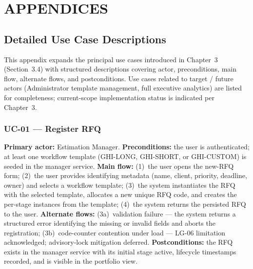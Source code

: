 \chapter*{APPENDICES}
\adjustmtc
\thispagestyle{MyStyle}
\makeatletter\renewcommand{}\makeatother
\appendix
\renewcommand{\thefigure}{A.\arabic{figure}}
\setcounter{figure}{0}

\section{Detailed Use Case Descriptions}
\label{app:use-cases}

This appendix expands the principal use cases introduced in Chapter~3 (Section~3.4) with structured descriptions covering actor, preconditions, main flow, alternate flows, and postconditions. Use cases related to target / future actors (Administrator template management, full executive analytics) are listed for completeness; current-scope implementation status is indicated per Chapter~3.

\subsection{UC-01 --- Register RFQ}
\textbf{Primary actor:} Estimation Manager. \textbf{Preconditions:} the user is authenticated; at least one workflow template (GHI-LONG, GHI-SHORT, or GHI-CUSTOM) is seeded in the manager service. \textbf{Main flow:} (1)~the user opens the new-RFQ form; (2)~the user provides identifying metadata (name, client, priority, deadline, owner) and selects a workflow template; (3)~the system instantiates the RFQ with the selected template, allocates a new unique RFQ code, and creates the per-stage instances from the template; (4)~the system returns the persisted RFQ to the user. \textbf{Alternate flows:} (3a)~validation failure --- the system returns a structured error identifying the missing or invalid fields and aborts the registration; (3b)~code-counter contention under load --- LG-06 limitation acknowledged; advisory-lock mitigation deferred. \textbf{Postconditions:} the RFQ exists in the manager service with its initial stage active, lifecycle timestamps recorded, and is visible in the portfolio view.

